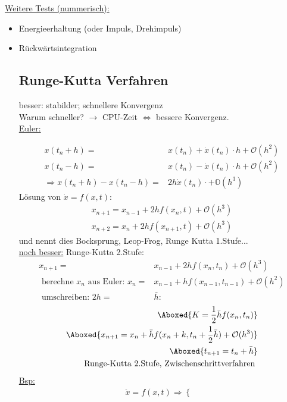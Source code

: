 \documentclass[12pt]{article}
\begin{document}
\underline{Weitere Tests (nummerisch):}\\
\begin{itemize}
\item Energieerhaltung (oder Impuls, Drehimpuls) 
\item Rückwärtsintegration
\subsection{Runge-Kutta Verfahren}
besser: stabilder; schnellere Konvergenz \\
Warum schneller? $\to$ CPU-Zeit $\Leftrightarrow$ bessere Konvergenz.\\

\underline{Euler:} 

\begin{align}
x(t_n +h) =& x(t_n) + \dot{x}(t_n) \cdot h + \mathcal{O}(h^2) \\
x(t_n -h) =& x(t_n) - \dot{x}(t_n) \cdot h + \mathcal{O}(h^2)  \\
 \Rightarrow x(t_n +h) - x(t_n -h) =&2 h \dot{x}(t_n) \cdot  + \mathbb{O}(h^3)
\end{align}
Lösung von $\dot{x}= f(x,t):$
\begin{align}
x_{n+1}= x_{n-1} + 2 h f(x_n, t) + \mathcal{O} (h^3) \\
x_{n+2}= x_{n} + 2 h f(x_{n+1}, t) + \mathcal{O} (h^3)
\end{align}
und nennt dies Bocksprung, Leop-Frog, Runge Kutta 1.Stufe...\\
\underline{noch besser:} Runge-Kutta 2.Stufe:
\begin{align}
x_{n+1} =& x_{n-1}+2hf(x_{n}, t_n) + \mathcal{O}(h^3) \\
\mbox{ berechne } x_n \mbox{ aus Euler: } x_n = &x_{n-1} + h f(x_{n-1}, t_{n-1}) + \mathcal{O}(h^2) \\
\mbox{ umschreiben: } 2h=&\bar{h} : 
\end{align}
\begin{align}
\Aboxed{K=\frac{1}{2} \bar{h} f(x_n, t_n) } \\
\Aboxed{x_{n+1}= x_n + \bar{h} f(x_n+k, t_n+\frac{1}{2}\bar{h}) + \mathcal{O}(h^3) } \\
\Aboxed{t_{n+1} = t_n + \bar{h} } \\
\mbox{ Runge-Kutta 2.Stufe, Zwischenschrittverfahren }
\end{align}
\underline{Bsp:}\begin{align}
\ddot{x}= f(x,t) \Rightarrow \begin{cases}

\end{cases}
\end{align}
\end{itemize}
\end{document}
